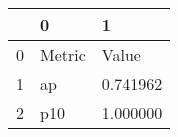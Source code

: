 \begin{tabular}{lll}
\toprule
 & 0 & 1 \\
\midrule
0 & Metric & Value \\
1 & ap & 0.741962 \\
2 & p10 & 1.000000 \\
\bottomrule
\end{tabular}
